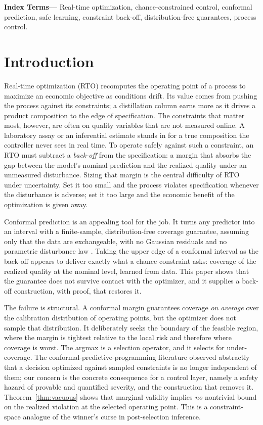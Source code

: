 \documentclass[journal]{IEEEtran}
\begin{document}
\noindent\textbf{Index Terms---}
Real-time optimization, chance-constrained control, conformal prediction, safe learning,
constraint back-off, distribution-free guarantees, process control.




\section{Introduction}
\label{sec:intro}

Real-time optimization (RTO) recomputes the operating point of a process to
maximize an economic objective as conditions drift. Its value comes from pushing the process
against its constraints; a distillation column earns more as it drives a product composition to
the edge of specification. The constraints that matter most, however, are often on quality
variables that are not measured online. A laboratory assay or an inferential estimate stands in
for a true composition the controller never sees in real time. To operate safely against such a
constraint, an RTO must subtract a \emph{back-off} from the specification: a margin that absorbs
the gap between the model's nominal prediction and the realized quality under an unmeasured
disturbance. Sizing that margin is the central difficulty of RTO under uncertainty. Set it too
small and the process violates specification whenever the disturbance is adverse; set it too
large and the economic benefit of the optimization is given away.

Conformal prediction is an appealing tool for the job. It turns any predictor into an interval
with a finite-sample, distribution-free coverage guarantee, assuming only that the data are
exchangeable, with no Gaussian residuals and no parametric disturbance law
\cite{vovk2005,lei2018,angelopoulos2023}. Taking the upper edge of a conformal interval as the
back-off appears to deliver exactly what a chance constraint asks: coverage of the realized
quality at the nominal level, learned from data. This paper shows that the guarantee does not
survive contact with the optimizer, and it supplies a back-off construction, with proof, that
restores it.

The failure is structural. A conformal margin guarantees coverage \emph{on average} over the
calibration distribution of operating points, but the optimizer does not sample that
distribution. It deliberately seeks the boundary of the feasible region, where the margin is
tightest relative to the local risk and therefore where coverage is worst. The argmax is a
selection operator, and it selects for under-coverage. The conformal-predictive-programming
literature \cite{zhao2024cpp} observed abstractly that a decision optimized against sampled
constraints is no longer independent of them; our concern is the concrete consequence for a
control layer, namely a safety hazard of provable and quantified severity, and the construction
that removes it. Theorem~\ref{thm:vacuous} shows that marginal validity implies \emph{no}
nontrivial bound on the realized violation at the selected operating point. This is a
constraint-space analogue of the winner's curse in post-selection inference.
\end{document}
